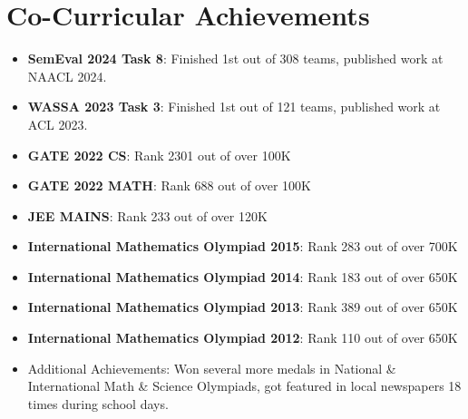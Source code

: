 \documentclass[letterpaper,11pt]{article}
\newcommand{\resumeItem}[1]{\item\small{{#1 \vspace{-2pt}}}}
\newcommand{\resumeSubHeadingListStart}{\begin{itemize}[leftmargin=0.0in, label={}]}
\newcommand{\resumeSubHeadingListEnd}{\end{itemize}}
\begin{document}
\section{\textcolor{myColor1}{Co-Curricular Achievements}}
  \resumeSubHeadingListStart
    \resumeItem{\textbf{\textcolor{myColor2}{SemEval 2024 Task 8}}: Finished 1st out of 308 teams, published work at NAACL 2024.}\vspace{-4pt}
    \resumeItem{\textbf{\textcolor{myColor2}{WASSA 2023 Task 3}}: Finished 1st out of 121 teams, published work at ACL 2023.}\vspace{-4pt}
    \resumeItem{\textbf{\textcolor{myColor2}{GATE 2022 CS}}: Rank 2301 out of over 100K\vspace{-4pt}}
    \resumeItem{\textbf{\textcolor{myColor2}{GATE 2022 MATH}}: Rank 688 out of over 100K\vspace{-4pt}}
    \resumeItem{\textbf{\textcolor{myColor2}{JEE MAINS}}: Rank 233 out of over 120K\vspace{-4pt}}
    \resumeItem{\textbf{\textcolor{myColor2}{International Mathematics Olympiad 2015}}: Rank 283 out of over 700K\vspace{-4pt}}
    \resumeItem{\textbf{\textcolor{myColor2}{International Mathematics Olympiad 2014}}: Rank 183 out of over 650K\vspace{-4pt}}
    \resumeItem{\textbf{\textcolor{myColor2}{International Mathematics Olympiad 2013}}: Rank 389 out of over 650K\vspace{-4pt}}
    \resumeItem{\textbf{\textcolor{myColor2}{International Mathematics Olympiad 2012}}: Rank 110 out of over 650K\vspace{-4pt}}
    \resumeItem{Additional Achievements: Won several more medals in National \& International Math \& Science Olympiads, got featured in local newspapers 18 times during school days.}\vspace{-4pt}
  \resumeSubHeadingListEnd
\end{document}
